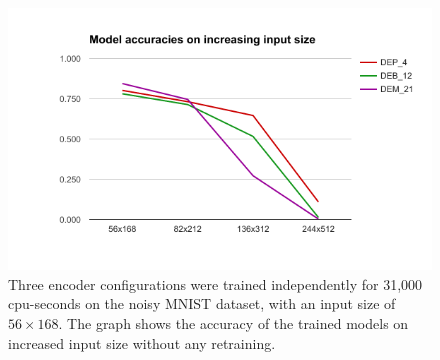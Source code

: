 
\begin{figure}
    \centering
    \includegraphics[scale=0.6]{resources/mnist_resilience.png}
    \caption{Three encoder configurations were trained independently for 31,000 cpu-seconds on the noisy MNIST dataset, with an input size of $56 \times 168$. The graph shows the accuracy of the trained models on increased input size without any retraining.}
    \label{fig:mnist_resilience}
\end{figure}